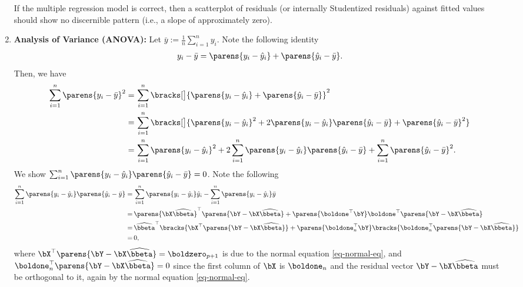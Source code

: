 \documentclass[12pt]{article}
\begin{document}
\begin{enumerate}[label=\textbf{\arabic*.}]
	If the multiple regression model is correct, then a scatterplot of residuals (or internally Studentized residuals) against fitted values should show no discernible pattern (i.e., a slope of approximately zero). 
	
	\item \textbf{Analysis of Variance (ANOVA):} Let $\bar{y} := \frac{1}{n} \sum_{i=1}^n y_i$. Note the following identity 
	\begin{align*}
		y_i - \bar{y} = \parens{y_i - \hat{y}_i} + \parens{\hat{y}_i - \bar{y}}. 
	\end{align*}
	Then, we have 
	\begin{align*}
		\sum_{i=1}^n \parens{y_i - \bar{y}}^2 = & \, \sum_{i=1}^n \bracks[\big]{\parens{y_i - \hat{y}_i} + \parens{\hat{y}_i - \bar{y}}}^2 \\ 
		= & \, \sum_{i=1}^n \bracks[\big]{\parens{y_i - \hat{y}_i}^2 + 2 \parens{y_i - \hat{y}_i} \parens{\hat{y}_i - \bar{y}} + \parens{\hat{y}_i - \bar{y}}^2} \\ 
		= & \, \sum_{i=1}^n \parens{y_i - \hat{y}_i}^2 + 2 \sum_{i=1}^n \parens{y_i - \hat{y}_i} \parens{\hat{y}_i - \bar{y}} + \sum_{i=1}^n \parens{\hat{y}_i - \bar{y}}^2. 
	\end{align*}
	We show $\sum_{i=1}^n \parens{y_i - \hat{y}_i} \parens{\hat{y}_i - \bar{y}} = 0$. Note the following 
	\begin{align*}
		\sum_{i=1}^n \parens{y_i - \hat{y}_i} \parens{\hat{y}_i - \bar{y}} = & \, \sum_{i=1}^n \parens{y_i - \hat{y}_i} \hat{y}_i - \sum_{i=1}^n \parens{y_i - \hat{y}_i} \bar{y} \\ 
		= & \, \parens{\bX \widehat{\bbeta}}^\top \parens{\bY - \bX \widehat{\bbeta}} + \parens{\boldone^\top \bY} \boldone^\top \parens{\bY - \bX \widehat{\bbeta}} \\ 
		= & \, \widehat{\bbeta}^\top \bracks{\bX^\top  \parens{\bY - \bX \widehat{\bbeta}}} + \parens{\boldone_n^\top \bY} \bracks{\boldone_n^\top \parens{\bY - \bX \widehat{\bbeta}} } \\ 
		= & \, 0, 
	\end{align*}
	where $\bX^\top \parens{\bY - \bX \widehat{\bbeta}} = \boldzero_{p+1}$ is due to the normal equation \eqref{eq-normal-eq}, and $\boldone_n^\top \parens{\bY - \bX \widehat{\bbeta}} = 0$ since the first column of $\bX$ is $\boldone_{n}$ and the residual vector $\bY - \bX \widehat{\bbeta}$ must be orthogonal to it, again by the normal equation \eqref{eq-normal-eq}. 
	

\end{enumerate}
\end{document}
